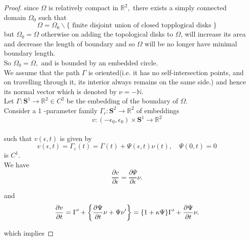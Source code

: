 \documentclass[oneside]{book}
\begin{document}
	
	\begin{proof}
		
		since $\Omega$ is relatively compact in $\mathbb{R}^{2},$ there exists a simply connected \\
		domain $\Omega_{0}$ such that
		$$
		\Omega=\Omega_{0} \backslash\{\text{ finite disjoint union of closed topplogical disks 
		}\} $$
		but $\Omega_{0}=\Omega $ otherwise on adding the topological disks to $\Omega$, will increase its area and decrease the length of boundary and so $\Omega$ will be no longer have minimal boundary length. \\
		So $\Omega_{0}=\Omega,$ and is bounded by an embedded circle.\\
		
		We assume that the path $\Gamma$ is oriented(i.e. it has no self-intersection points, and on travelling through it, its interior always remains on the same side.) and hence its normal vector which is denoted by $\nu = - \mathbb{N}$. \\
		
		
		Let $\Gamma: \mathbf{S}^{1} \rightarrow \mathbb{R}^{2} \in C^{2}$ be the embedding of the boundary of $\Omega .$ 
		\\ 
		Consider a    1 -parameter family $\Gamma_{\epsilon}: \mathbf{S}^{2} \rightarrow \mathbb{R}^{2}$ of embeddings
		$$
		v:\left(-\epsilon_{0}, \epsilon_{0}\right) \times \mathbf{S}^{1} \rightarrow \mathbb{R}^{2}
		$$ \\
		such that  $v(\epsilon, t)$ is given by \\
		\begin{equation}
		\label{eq10}  
		v(\epsilon, t)=\Gamma_{\varepsilon}(t)=\Gamma(t)+\Psi(\epsilon, t) \nu(t), \quad \Psi(0, t)=0
		\end{equation} 
		is $C^{1} .$ \\
		We have
		\begin{equation}
		\label{eq11}  
		\frac{\partial v}{\partial \epsilon}=\frac{\partial \Psi}{\partial \epsilon} \nu.
		\end{equation}
		
		and 
		\begin{equation}
		\label{eq12}  
		\\  \frac{\partial v}{\partial t}=\Gamma^{\prime}+\left\{\frac{\partial \Psi}{\partial t} \nu+\Psi \nu^{\prime}\right\}=\{1+\kappa \Psi\} \Gamma^{\prime}+\frac{\partial \Psi}{\partial t} \nu.
		\end{equation}    
		
		which implies  
		

\end{proof}
\end{document}
